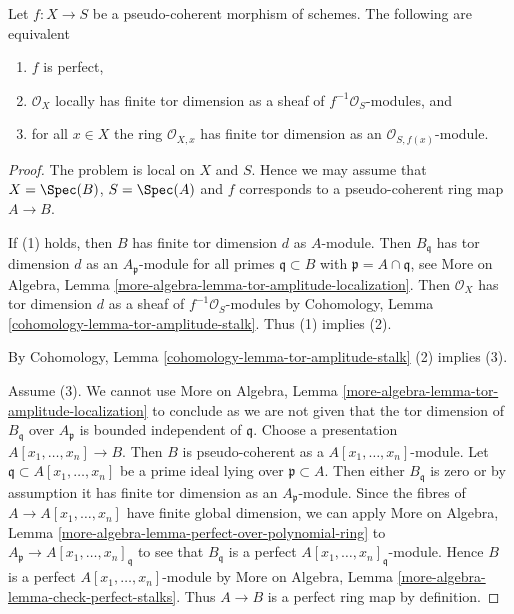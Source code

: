 \begin{lemma}
\label{lemma-check-perfect-stalks}
Let $f : X \to S$ be a pseudo-coherent morphism of schemes.
The following are equivalent
\begin{enumerate}
\item $f$ is perfect,
\item $\mathcal{O}_X$ locally has finite tor dimension as a
sheaf of $f^{-1}\mathcal{O}_S$-modules, and
\item for all $x \in X$ the ring $\mathcal{O}_{X, x}$ has finite tor
dimension as an $\mathcal{O}_{S, f(x)}$-module.
\end{enumerate}
\end{lemma}

\begin{proof}
The problem is local on $X$ and $S$. Hence we may assume that
$X = \Spec(B)$, $S = \Spec(A)$ and $f$ corresponds to a pseudo-coherent
ring map $A \to B$.

\medskip\noindent
If (1) holds, then $B$ has finite tor dimension $d$ as $A$-module. Then
$B_\mathfrak q$ has tor dimension $d$ as an $A_\mathfrak p$-module for all
primes $\mathfrak q \subset B$ with $\mathfrak p = A \cap \mathfrak q$, see
More on Algebra, Lemma \ref{more-algebra-lemma-tor-amplitude-localization}.
Then $\mathcal{O}_X$ has tor dimension $d$ as a 
sheaf of $f^{-1}\mathcal{O}_S$-modules by
Cohomology, Lemma \ref{cohomology-lemma-tor-amplitude-stalk}.
Thus (1) implies (2).

\medskip\noindent
By Cohomology, Lemma \ref{cohomology-lemma-tor-amplitude-stalk} (2) implies
(3).

\medskip\noindent
Assume (3). We cannot use
More on Algebra, Lemma \ref{more-algebra-lemma-tor-amplitude-localization}
to conclude as we are not given that the tor dimension of
$B_\mathfrak q$ over $A_\mathfrak p$ is bounded independent of $\mathfrak q$.
Choose a presentation $A[x_1, \ldots, x_n] \to B$. Then $B$ is
pseudo-coherent as a $A[x_1, \ldots, x_n]$-module. Let
$\mathfrak q \subset A[x_1, \ldots, x_n]$ be a prime ideal
lying over $\mathfrak p \subset A$. Then either $B_\mathfrak q$ is zero
or by assumption it has finite tor dimension as an
$A_\mathfrak p$-module. Since the fibres of $A \to A[x_1, \ldots, x_n]$
have finite global dimension, we can apply
More on Algebra, Lemma \ref{more-algebra-lemma-perfect-over-polynomial-ring}
to $A_\mathfrak p \to A[x_1, \ldots, x_n]_\mathfrak q$
to see that $B_\mathfrak q$ is a perfect
$A[x_1, \ldots, x_n]_\mathfrak q$-module. Hence
$B$ is a perfect $A[x_1, \ldots, x_n]$-module by
More on Algebra, Lemma \ref{more-algebra-lemma-check-perfect-stalks}.
Thus $A \to B$ is a perfect ring map by definition.
\end{proof}

